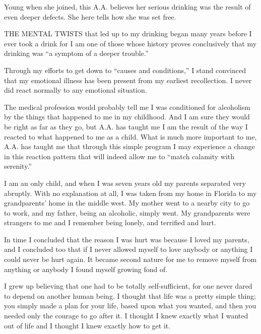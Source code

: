 
\bbChapterPreamble


\begin{biblechapter}
    Young when she joined, 
    this A.A. believes her serious drinking 
    was the result of even deeper defects.
\verse She here tells how she was set free.
\end{biblechapter}


\begin{biblechapter}
    THE MENTAL TWISTS that led up to my drinking 
    began many years before I ever took a drink 
    for I am one of those whose history proves conclusively 
    that my drinking was “a symptom of a deeper trouble.”

\verse Through my efforts to get down to “causes and conditions,” 
    I stand convinced that my emotional illness 
    has been present from my earliest recollection.
\verse I never did react normally to any emotional situation.

\verse The medical profession would probably tell me I was conditioned for alcoholism by the things that happened to me in my childhood. And I am sure they would be right as far as they go, but A.A. has taught me I am the result of the way I reacted to what happened to me as a child. What is much more important to me, A.A. has taught me that through this simple program I may experience a change in this reaction pattern that will indeed allow me to “match calamity with serenity.”

I am an only child, and when I was seven years old my parents separated very abruptly. With no explanation at all, I was taken from my home in Florida to my grandparents’ home in the middle west. My mother went to a nearby city to go to work, and my father, being an alcoholic, simply went. My grandparents were strangers to me and I remember being lonely, and terrified and hurt.

In time I concluded that the reason I was hurt was because I loved my parents, and I concluded too that if I never allowed myself to love anybody or anything I could never be hurt again. It became second nature for me to remove myself from anything or anybody I found myself growing fond of.

I grew up believing that one had to be totally self-sufficient, for one never dared to depend on another human being. I thought that life was a pretty simple thing; you simply made a plan for your life, based upon what you wanted, and then you needed only the courage to go after it. I thought I knew exactly what I wanted out of life and I thought I knew exactly how to get it.


\end{biblechapter}
